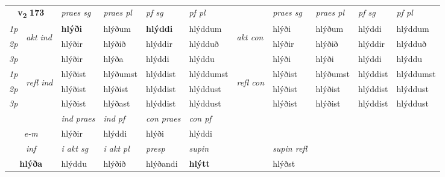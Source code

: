 \noindent
\begin{tabular}{lllllllllll} \toprule
\multicolumn{2}{c}{\textbf{v{\textsubscript{2}}} \Large{\textbf{173}}}  &  \textit{praes sg}  & \textit{praes pl}  &\textit{ pf sg} & \textit{pf pl} &  &  \textit{praes sg}  & \textit{praes pl}  & \textit{pf sg} & \textit{pf pl } \\*
	\cmidrule{3-6} \cmidrule{8-11}
 {\textit{1p}} & \multirow{3}{*}{\begin{turn}{90}\textit{akt ind}\end{turn}} & \textbf{hlýði} & hlýðum & \textbf{hlýddi} & hlýddum & \multirow{3}{*}{\begin{turn}{90}\textit{akt con}\end{turn}} &hlýði & hlýðum & hlýddi & hlýddum\\*
 {\textit{2p}} &  &  hlýðir  & hlýðið & hlýddir & hlýdduð & & hlýðir & hlýðið & hlýddir & hlýdduð \\*
{\textit{3p}} &  & hlýðir & hlýða & hlýddi & hlýddu & & hlýði & hlýði& hlýddi & hlýddu \\*
\cmidrule{3-6} \cmidrule{8-11}
 {\textit{1p}} & \multirow{3}{*}{\begin{turn}{90}\textit{refl ind}\end{turn}}  & hlýðist & hlýðumst & hlýddist & hlýddumst & \multirow{3}{*}{\begin{turn}{90}\textit{refl con}\end{turn}}  &hlýðist & hlýðumst & hlýddist & hlýddumst \\*
 {\textit{2p}} &  & hlýðist & hlýðist & hlýddist & hlýddust & &hlýðist & hlýðist & hlýddist & hlýddust \\*
 {\textit{3p}}  & & hlýðist & hlýðast & hlýddist & hlýddust & & hlýðist & hlýðist& hlýddist & hlýddust \\*
\cmidrule{3-6} \cmidrule{8-11}

   & &  \textit{ind praes} & \textit{ind pf} & \textit{con praes} & \textit{con pf} \\*
\multicolumn{2}{c}{ \textit{e-m} } & hlýðir & hlýddi & hlýði & hlýddi \\*

\cmidrule{3-8}
   \multicolumn{2}{c}{\textit{inf}}  & \textit{i akt sg} & \textit{i akt pl}   & \textit{presp} & \textit{supin} && \textit{supin refl}  \\*
  \multicolumn{2}{c}{\textbf{hlýða}} & hlýddu  & hlýðið   & hlýðandi &  \textbf{hlýtt} && hlýðst  \\*
\end{tabular}

